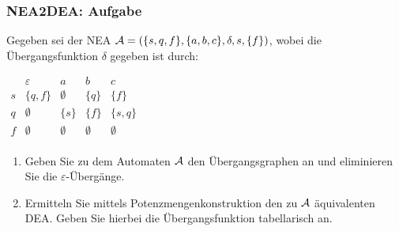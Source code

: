 \begin{frame}
	\frametitle{NEA2DEA: Aufgabe}
Gegeben sei der NEA ${\cal A}=(\{s,q,f\},\{a,b,c\},\delta,s,\{f\})$, wobei
die Übergangsfunktion $\delta$ gegeben ist durch:
\begin{center}
$\begin{array}{r|cccc}
&\varepsilon & a & b & c\\\hline
s & \{q,f\} & \emptyset & \{q\} &\{f\}\\
q &  \emptyset & \{s\} & \{f\} & \{s,q\}\\
f & \emptyset & \emptyset &  \emptyset &  \emptyset\\
\end{array}$
\end{center}
\begin{enumerate}
\item Geben Sie zu dem Automaten ${\cal A}$ den Übergangsgraphen an und eliminieren
Sie die $\varepsilon$-Übergänge.
\item Ermitteln Sie mittels Potenzmengenkonstruktion den zu ${\cal A}$ äquivalenten
DEA. Geben Sie hierbei die Übergangsfunktion tabellarisch an.
\end{enumerate}
\end{frame}
%



